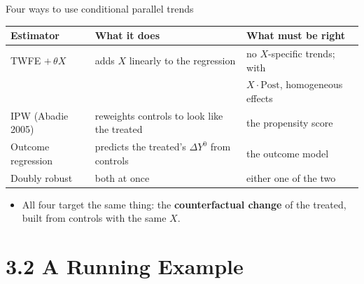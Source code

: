 \documentclass[
  11pt,
  ignorenonframetext,
  aspectratio=169,
]{beamer}
\providecommand{\tightlist}{%
  \setlength{\itemsep}{0pt}\setlength{\parskip}{0pt}}
\begin{document}
\begin{frame}{Four ways to use conditional parallel trends}
\protect{}\label{four-ways-to-use-conditional-parallel-trends}
\begin{center}\small
\begin{tabular}{lll}
\toprule
Estimator & What it does & What must be right \\
\midrule
TWFE $+\,\theta X$ & adds $X$ linearly to the regression & no $X$-specific trends; with \\
 & & $X \cdot \text{Post}$, homogeneous effects \\
IPW (Abadie 2005) & reweights controls to look like the treated & the propensity score \\
Outcome regression & predicts the treated's $\Delta Y^0$ from controls & the outcome model \\
Doubly robust & both at once & either one of the two \\
\bottomrule
\end{tabular}
\end{center}

\begin{itemize}
\tightlist
\item
  All four target the same thing: the \textbf{counterfactual change} of
  the treated, built from controls with the same \(X\).
\end{itemize}
\end{frame}

\section{3.2 A Running Example}\label{a-running-example}
\end{document}
